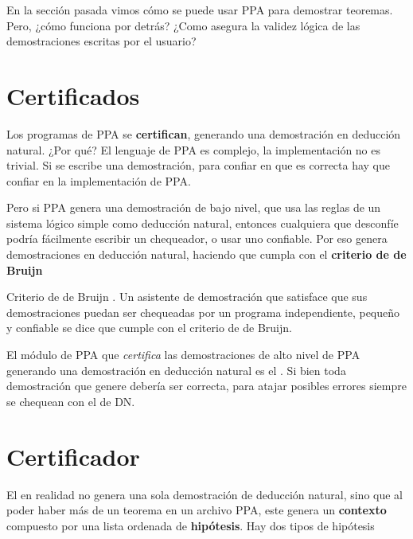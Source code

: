 En la sección pasada vimos cómo se puede usar PPA para demostrar teoremas. Pero,
¿cómo funciona por detrás? ¿Como asegura la validez lógica de las
demostraciones escritas por el usuario?

\section{Certificados}

Los programas de PPA se \textbf{certifican}, generando una demostración en
deducción natural. ¿Por qué? El lenguaje de PPA es complejo, la implementación
no es trivial. Si se escribe una demostración, para confiar en que es correcta
hay que confiar en la implementación de PPA.

Pero si PPA genera una demostración de bajo nivel, que usa las reglas de un
sistema lógico simple como deducción natural, entonces cualquiera que desconfíe
podría fácilmente escribir un chequeador, o usar uno confiable. Por eso genera
demostraciones en deducción natural, haciendo que cumpla con el \textbf{criterio
de de Bruijn}

\begin{definition}{Criterio de de Bruijn \cite{freek-bruijn}.} Un asistente de
    demostración que satisface que sus demostraciones puedan ser chequeadas por
    un programa independiente, pequeño y confiable se dice que cumple con el
    criterio de de Bruijn.
\end{definition}

El módulo de PPA que \textit{certifica} las demostraciones de alto nivel de PPA
generando una demostración en deducción natural es el \modCertifier{}. Si
bien toda demostración que genere debería ser correcta, para atajar posibles
errores siempre se chequean con el \modChecker{} de DN.



\section{Certificador}

El \modCertifier en realidad no genera una sola demostración de deducción
natural, sino que al poder haber más de un teorema en un archivo PPA, este
genera un \textbf{contexto} compuesto por una lista ordenada de
\textbf{hipótesis}. Hay dos tipos de hipótesis

